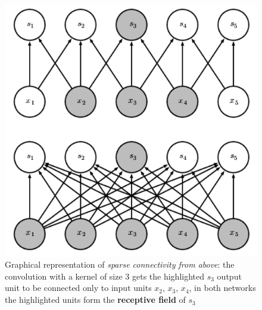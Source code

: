 \documentclass[11pt,a4paper,titlepage]{book}
\begin{document}
\begin{figure}[ht]
    \includegraphics[scale=0.5]{imgs/ch_1/sparse_connectivity.png}
    \centering
    \caption{Graphical representation of \textit{sparse connectivity from above}: the convolution with a kernel of size 3 gets the highlighted $s_3$ output unit to be connected only to input units $x_2$, $x_3$, $x_4$, in both networks the highlighted units form the \textbf{receptive field} of $s_3$}
    \label{sparse_connectivity_above}
\end{figure}
\end{document}
